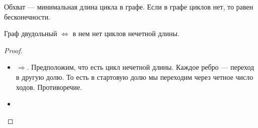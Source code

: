 \begin{definition}
    Обхват --- минимальная длина цикла в графе. Если в графе циклов нет, то равен бесконечности.
\end{definition}
\begin{definition}
    Граф двудольный $\iff$ в нем нет циклов нечетной длины.
\end{definition}
\begin{proof}
    \slashn
    \begin{itemize}
        \item $\Rightarrow$. Предположим, что есть цикл нечетной длины. Каждое ребро --- переход в другую долю. То есть в стартовую долю мы переходим через четное число ходов. Противоречие.
        \item 
    \end{itemize}
\end{proof}

